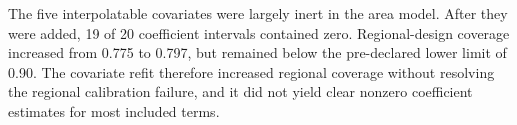 The five interpolatable covariates were largely inert in the area model. After they were added, 19 of 20 coefficient intervals contained zero. Regional-design coverage increased from 0.775 to 0.797, but remained below the pre-declared lower limit of 0.90. The covariate refit therefore increased regional coverage without resolving the regional calibration failure, and it did not yield clear nonzero coefficient estimates for most included terms.
